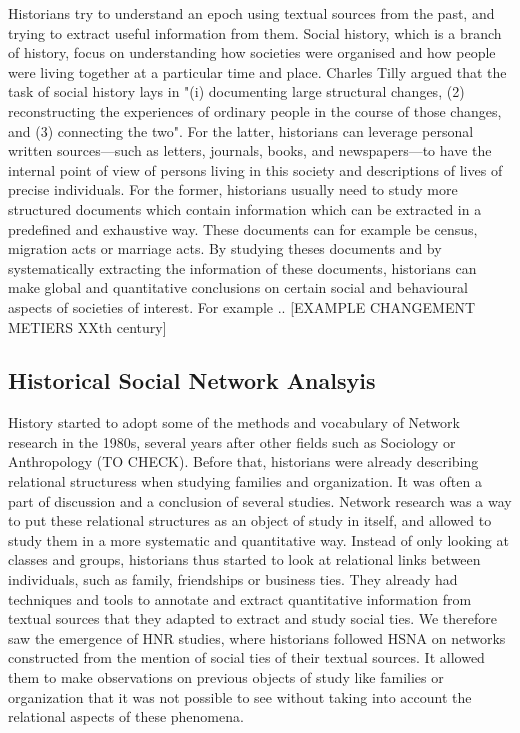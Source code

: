 Historians try to understand an epoch using textual sources from the past, and trying to extract useful information from them.
Social history, which is a branch of history, focus on understanding how societies were organised and how people were living together at a particular time and place. Charles Tilly argued that the task of social history lays in "(i) documenting large structural changes, (2) reconstructing the experiences of ordinary people in the course of those changes, and (3) connecting the two". For the latter, historians can leverage personal written sources---such as letters, journals, books, and newspapers---to have the internal point of view of persons living in this society and descriptions of lives of precise individuals.
For the former, historians usually need to study more structured documents which contain information which can be extracted in a predefined and exhaustive way. These documents can for example be census, migration acts or marriage acts. By studying theses documents and by systematically extracting the information of these documents, historians can make global and quantitative conclusions on certain social and behavioural aspects of societies of interest.
For example .. [EXAMPLE CHANGEMENT METIERS XXth century]



\subsection{Historical Social Network Analsyis}

History started to adopt some of the methods and vocabulary of Network research in the 1980s, several years after other fields such as Sociology or Anthropology (TO CHECK). Before that, historians were already describing relational structuress when studying families and organization. It was often a part of discussion and a conclusion of several studies.
Network research was a way to put these relational structures as an object of study in itself, and allowed to study them in a more systematic and quantitative way.
Instead of only looking at classes and groups, historians thus started to look at relational links between individuals, such as family, friendships or business ties.
They already had techniques and tools to annotate and extract quantitative information from textual sources that they adapted to extract and study social ties.
We therefore saw the emergence of HNR studies, where historians followed HSNA on networks constructed from the mention of social ties of their textual sources.
It allowed them to make observations on previous objects of study like families or organization that it was not possible to see without taking into account the relational aspects of these phenomena.


